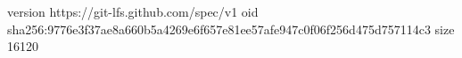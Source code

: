version https://git-lfs.github.com/spec/v1
oid sha256:9776e3f37ae8a660b5a4269e6f657e81ee57afe947c0f06f256d475d757114c3
size 16120

